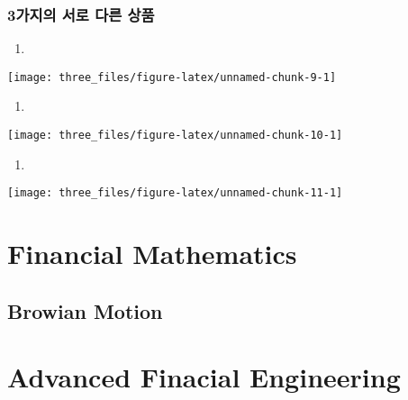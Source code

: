 \documentclass[
]{book}
\providecommand{\tightlist}{%
  \setlength{\itemsep}{0pt}\setlength{\parskip}{0pt}}
\theoremstyle{definition}
\theoremstyle{definition}
\theoremstyle{definition}
\theoremstyle{remark}
\begin{document}
\hypertarget{uxac00uxc9c0uxc758-uxc11cuxb85c-uxb2e4uxb978-uxc0c1uxd488}{%
\section{3가지의 서로 다른 상품}\label{uxac00uxc9c0uxc758-uxc11cuxb85c-uxb2e4uxb978-uxc0c1uxd488}}

\begin{enumerate}
\def\labelenumi{(\alph{enumi})}
\setcounter{enumi}{3}
\tightlist
\item
\end{enumerate}

\begin{center}\texttt{[image: three\_files/figure-latex/unnamed-chunk-9-1]} \end{center}

\begin{enumerate}
\def\labelenumi{(\alph{enumi})}
\setcounter{enumi}{4}
\tightlist
\item
\end{enumerate}

\begin{center}\texttt{[image: three\_files/figure-latex/unnamed-chunk-10-1]} \end{center}

\begin{enumerate}
\def\labelenumi{(\alph{enumi})}
\setcounter{enumi}{5}
\tightlist
\item
\end{enumerate}

\begin{center}\texttt{[image: three\_files/figure-latex/unnamed-chunk-11-1]} \end{center}

\hypertarget{part-financial-mathematics}{%
\part{Financial Mathematics}\label{part-financial-mathematics}}

\hypertarget{browian-motion}{%
\chapter{Browian Motion}\label{browian-motion}}

\hypertarget{part-advanced-finacial-engineering}{%
\part{Advanced Finacial Engineering}\label{part-advanced-finacial-engineering}}
\end{document}
